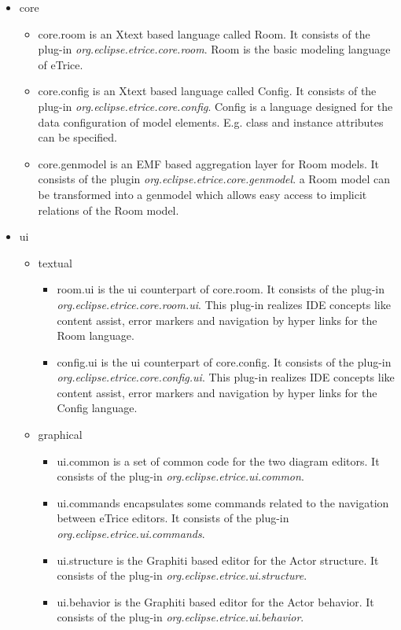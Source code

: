 \begin{itemize}
\item core

\begin{itemize}
\item core.room is an Xtext based language called Room. It consists of the plug-in 
\textit{org.eclipse.etrice.core.room}. Room is the basic modeling language of eTrice.
\item core.config is an Xtext based language called Config. It consists of the plug-in 
\textit{org.eclipse.etrice.core.config}. Config is a language designed for the data configuration of model 
elements. E.g. class and instance attributes can be specified.
\item core.genmodel is an EMF based aggregation layer for Room models. It consists of the plugin 
\textit{org.eclipse.etrice.core.genmodel}. a Room model can be transformed into a genmodel which allows 
easy access to implicit relations of the Room model.
\end{itemize}

\item ui
\begin{itemize}
\item textual
\begin{itemize}

\item room.ui is the ui counterpart of core.room.  It consists of the plug-in 
\textit{org.eclipse.etrice.core.room.ui}. This plug-in realizes IDE concepts like content assist, error 
markers and navigation by hyper links for the Room language.
\item config.ui is the ui counterpart of core.config.  It consists of the plug-in 
\textit{org.eclipse.etrice.core.config.ui}. This plug-in realizes IDE concepts like content assist, error 
markers and navigation by hyper links for the Config language.
\end{itemize}

\item graphical
\begin{itemize}
\item ui.common is a set of common code for the two diagram editors. It consists of the plug-in 
\textit{org.eclipse.etrice.ui.common}.
\item ui.commands encapsulates some commands related to the navigation between eTrice editors. It consists 
of the plug-in \textit{org.eclipse.etrice.ui.commands}.
\item ui.structure is the Graphiti based editor for the Actor structure. It consists of the plug-in 
\textit{org.eclipse.etrice.ui.structure}.
\item ui.behavior is the Graphiti based editor for the Actor behavior. It consists of the plug-in 
\textit{org.eclipse.etrice.ui.behavior}.
\end{itemize}
\end{itemize}


\end{itemize}
